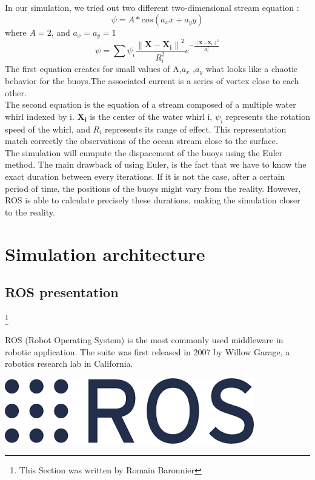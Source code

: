 \documentclass[a4paper]{report}
\begin{document}
In our simulation, we tried out two different two-dimensional stream equation :
\begin{equation}
\psi = A*cos(a_x x+a_y y)
\end{equation}
where $A=2$, and $a_x = a_y = 1$
\begin{equation}
\psi = \sum \psi _i \frac{\left \| \mathbf{X}-\mathbf{X_i} \right \|^2 }{R_i ^2}e^{ -\frac{\left \| \mathbf{X}-\mathbf{X_i} \right \|^2 }{R_i ^2}}
\end{equation}
The first equation creates for small values of A,$a_x$ ,$a_y$ what looks like a chaotic behavior for the buoys.The associated current is a series of vortex close to each other.\\

The second equation is the equation of a stream composed of a multiple water whirl indexed by i. $\mathbf{X_i}$ is the center of the water whirl i, $\psi _i$ represents the rotation speed of the whirl, and $R_i$ represents its range of effect. This representation match correctly the observations of the ocean stream close to the surface. \\

The simulation will cumpute the dispacement of the buoys using the Euler method. The main drawback of using Euler, is the fact that we have to know the exact duration between every iterations. If it is not the case, after a certain period of time, the positions of the buoys might vary from the reality. However, ROS is able to calculate precisely these durations, making the simulation closer to the reality. 




\chapter{Simulation architecture}
\section{ROS presentation}
\footnote{This Section was written by Romain Baronnier}

ROS (Robot Operating System) is the most commonly used middleware in robotic application. The suite was first released in 2007 by Willow Garage, a robotics research lab in California.\\
\begin{center}
\includegraphics[scale=0.4]{image/ros.png}
\end{center}
\end{document}
